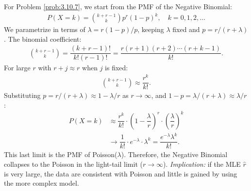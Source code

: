 \begin{solucion}
	\label{sol:3.10.7}
	For Problem \ref{prob:3.10.7}, we start from the PMF of the Negative Binomial:
	\begin{align*}
		P(X = k) = \binom{k + r - 1}{k} p^{r} (1-p)^{k}, \quad k = 0, 1, 2, \dots
	\end{align*}
	We parametrize in terms of $\lambda = r(1-p)/p$, keeping $\lambda$ fixed and $p = r/(r + \lambda)$. The binomial coefficient:
	\begin{align*}
		\binom{k + r - 1}{k} = \dfrac{(k+r-1)!}{k! (r-1)!} = \dfrac{r(r+1)(r+2)\cdots(r+k-1)}{k!}.
		\end{align*}
	For large $r$ with $r + j \approx r$ when $j$ is fixed:
	\begin{align*}
		\binom{k + r - 1}{k} \approx \dfrac{r^{k}}{k!}.
	\end{align*}
	Substituting $p = r/(r + \lambda) \approx 1 - \lambda/r$ as $r \to \infty$, and $1 - p = \lambda/(r + \lambda) \approx \lambda/r$:
	\begin{align*}
		P(X = k) &\approx \dfrac{r^{k}}{k!} \cdot \left(1 - \dfrac{\lambda}{r}\right)^{r} \cdot \left(\dfrac{\lambda}{r}\right)^{k} \\
		&\to \dfrac{1}{k!} \cdot e^{-\lambda} \cdot \lambda^{k} = \dfrac{e^{-\lambda}\lambda^{k}}{k!}.
	\end{align*}
	This last limit is the PMF of Poisson($\lambda$). Therefore, the Negative Binomial collapses to the Poisson in the light-tail limit ($r \to \infty$). \emph{Implication:} if the MLE $\hat{r}$ is very large, the data are consistent with Poisson and little is gained by using the more complex model. \qedhere
\end{solucion}

